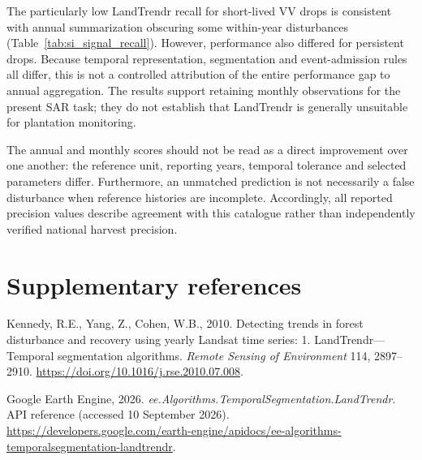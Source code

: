 \documentclass[11pt,a4paper]{article}
\begin{document}
The particularly low LandTrendr recall for short-lived VV drops is consistent with annual summarization obscuring some within-year disturbances (Table~\ref{tab:si_signal_recall}). However, performance also differed for persistent drops. Because temporal representation, segmentation and event-admission rules all differ, this is not a controlled attribution of the entire performance gap to annual aggregation. The results support retaining monthly observations for the present SAR task; they do not establish that LandTrendr is generally unsuitable for plantation monitoring.

The annual and monthly scores should not be read as a direct improvement over one another: the reference unit, reporting years, temporal tolerance and selected parameters differ. Furthermore, an unmatched prediction is not necessarily a false disturbance when reference histories are incomplete. Accordingly, all reported precision values describe agreement with this catalogue rather than independently verified national harvest precision.

\section*{Supplementary references}
\label{ref:kennedy}
Kennedy, R.E., Yang, Z., Cohen, W.B., 2010. Detecting trends in forest disturbance and recovery using yearly Landsat time series: 1. LandTrendr---Temporal segmentation algorithms. \textit{Remote Sensing of Environment} 114, 2897--2910. \url{https://doi.org/10.1016/j.rse.2010.07.008}.

\label{ref:gee}
Google Earth Engine, 2026. \textit{ee.Algorithms.TemporalSegmentation.LandTrendr}. API reference (accessed 10 September 2026). \url{https://developers.google.com/earth-engine/apidocs/ee-algorithms-temporalsegmentation-landtrendr}.
\end{document}
